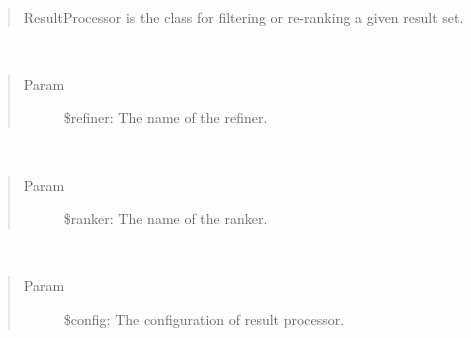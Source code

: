 \documentclass[letterpaper,10pt,english]{sphinxmanual}
\begin{document}
\begin{fulllineitems}
\label{docs/api:ResultProcessor}~\begin{quote}

ResultProcessor is the class for filtering or re-ranking a given result set.
\end{quote}

\begin{fulllineitems}
\label{docs/api:ResultProcessor::addOneRefiner}~\begin{quote}\begin{description}
\item[{Param}] \leavevmode
\$refiner: The name of the refiner.

\end{description}\end{quote}

\end{fulllineitems}


\begin{fulllineitems}
\label{docs/api:ResultProcessor::addOneRanker}~\begin{quote}\begin{description}
\item[{Param}] \leavevmode
\$ranker: The name of the ranker.

\end{description}\end{quote}

\end{fulllineitems}


\begin{fulllineitems}
\label{docs/api:ResultProcessor::addConfiguration}~\begin{quote}\begin{description}
\item[{Param}] \leavevmode
\$config: The configuration of result processor.

\end{description}\end{quote}


\end{fulllineitems}
\end{fulllineitems}
\end{document}
